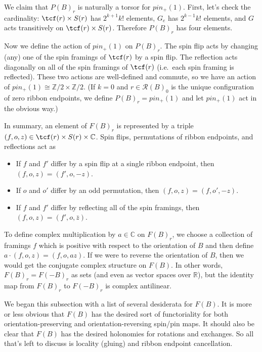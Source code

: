 \documentclass[12pt,a4paper]{article}
\newcommand{\zz}{\mathbb{Z}}
\newcommand{\cc}{\mathbb{C}}
\newcommand{\rr}{\mathbb{R}}
\newcommand{\mcr}{\mathcal{R}}
\begin{document}
We claim that $P(B)_r$ is naturally a torsor for $pin_+(1)$.
First, let's check the cardinality:
$\tcf(r) \times S(r)$ has $2^{k+1} k!$ elements,
$G_e$ has $2^{k-1} k!$ elements, and $G$ acts transitively on $\tcf(r) \times S(r)$.
Therefore $P(B)_r$ has four elements.

Now we define the action of $pin_+(1)$ on $P(B)_r$.
The spin flip acts by changing (any) one of the spin framings of $\tcf(r)$ by a spin flip.
The reflection acts diagonally on all of the spin framings of $\tcf(r)$
(i.e.\ each spin framing is reflected).
These two actions are well-defined and commute, so we have
an action of $pin_+(1) \cong \zz/2\times\zz/2$.
(If $k = 0$ and $r \in \mcr(B)_0$ is the unique configuration of zero ribbon endpoints,
we define $P(B)_r = pin_+(1)$ and let $pin_+(1)$ act in the obvious way.)

\medskip

In summary, an element of $F(B)_r$ is represented by a triple $(f, o, z) \in \tcf(r) \times S(r) \times \cc$.
Spin flips, permutations of ribbon endpoints, and reflections act as
\begin{itemize}
\item If $f$ and $f'$ differ by a spin flip at a single ribbon endpoint, then $(f, o, z) = (f', o, -z)$.
\item If $o$ and $o'$ differ by an odd permutation, then $(f, o, z) = (f, o', -z)$.
\item If $f$ and $f'$ differ by reflecting all of the spin framings, then $(f, o, z) = (f', o, \bar z)$.
\end{itemize}

To define complex multiplication by $a\in\cc$ on $F(B)_r$, we choose a collection of framings $f$ which is positive
with respect to the orientation of $B$ and then define $a\cdot (f, o, z) = (f, o, az)$.
If we were to reverse the orientation of $B$, then we would get the conjugate complex structure on $F(B)$.
In other words, $F(B)_r = F(-B)_r$ as sets (and even as vector spaces over $\rr$), but the identity map from
$F(B)_r$ to $F(-B)_r$ is complex antilinear.

\medskip

We began this subsection with a list of several desiderata for $F(B)$.
It is more or less obvious that $F(B)$ has the desired sort of functoriality for both orientation-preserving
and orientation-reversing spin/pin maps.
It should also be clear that $F(B)$ has the desired holonomies for rotations and exchanges.
So all that's left to discuss is locality (gluing) and ribbon endpoint cancellation.
\end{document}

